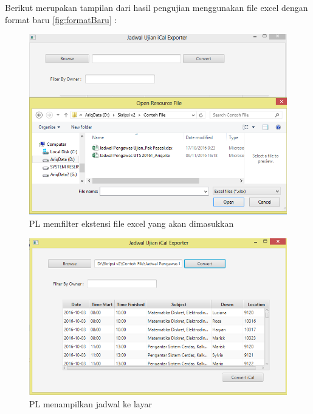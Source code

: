 Berikut merupakan tampilan dari hasil pengujian menggunakan file excel dengan format baru \ref{fig:formatBaru} :

		\begin{figure}[H]
		\centering
		\includegraphics[scale=0.7]{Gambar/filterExtension}
		\caption{PL memfilter ekstensi file excel yang akan dimasukkan}
		\label{fig:filterExtension}
		\end{figure}
	 
		\begin{figure}[H]
		\centering
		\includegraphics[scale=0.7]{Gambar/jadwalKeLayarEksperimental}
		\caption{PL menampilkan jadwal ke layar}
		\label{fig:jadwalKeLayarEksperimental}
		\end{figure}
 
